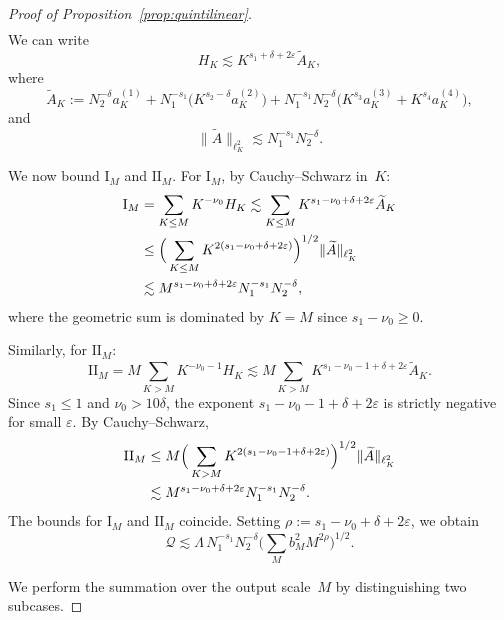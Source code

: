 \documentclass[11pt,reqno,english]{amsart}
\numberwithin{equation}{section}
\theoremstyle{plain}
\theoremstyle{definition}
\theoremstyle{remark}
\renewcommand{\epsilon}{\varepsilon}
\begin{document}
\begin{proof}[Proof of Proposition~\ref{prop:quintilinear}]
\begin{align}
\end{align}
We can write
\begin{equation}\label{eq:HK-final}
	H_K \lesssim K^{s_1+\delta+2\epsilon} \widetilde{A}_K,
\end{equation}
where
\[
\widetilde{A}_K := N_2^{-\delta} a_K^{(1)} + N_1^{-s_1} \big(K^{s_2-\delta} a_K^{(2)}\big) + N_1^{-s_1} N_2^{-\delta} \big(K^{s_3} a_K^{(3)} + K^{s_4} a_K^{(4)}\big),
\]
and
\begin{equation}\label{eq:Atilde-norm}
	\|\widetilde{A}\|_{\ell_K^2} \lesssim N_1^{-s_1} N_2^{-\delta}.
\end{equation}

We now bound $\mathrm{I}_M$ and $\mathrm{II}_M$. For $\mathrm{I}_M$, by Cauchy--Schwarz in~$K$:
\begin{align}
	\mathrm{I}_M &= \sum_{K \le M} K^{-\nu_0} H_K \lesssim \sum_{K \le M} K^{s_1 - \nu_0 + \delta + 2\epsilon} \widetilde{A}_K \notag \\
	&\le \Big(\sum_{K \le M} K^{2(s_1 - \nu_0 + \delta + 2\epsilon)}\Big)^{1/2} \|\widetilde{A}\|_{\ell_{K}^2} \notag \\
	&\lesssim M^{s_1 - \nu_0 + \delta + 2\epsilon} N_1^{-s_1} N_2^{-\delta}, \label{eq:IM-bound}
\end{align}
where the geometric sum is dominated by $K=M$ since $s_1 - \nu_0 \geq 0$.

Similarly, for $\mathrm{II}_M$:
\[
\mathrm{II}_M = M \sum_{K > M} K^{-\nu_0-1} H_K \lesssim M \sum_{K > M} K^{s_1 - \nu_0 - 1 + \delta + 2\epsilon} \widetilde{A}_K.
\]
Since $s_1 \le 1$ and $\nu_0 > 10\delta$, the exponent $s_1 - \nu_0 - 1 + \delta + 2\epsilon$ is strictly negative for small $\epsilon$. By Cauchy--Schwarz,
\begin{align}
	\mathrm{II}_M &\le M \Big(\sum_{K > M} K^{2(s_1 - \nu_0 - 1 + \delta + 2\epsilon)}\Big)^{1/2} \|\widetilde{A}\|_{\ell_{K}^2} \notag \\
	&\lesssim M^{s_1 - \nu_0 + \delta + 2\epsilon} N_1^{-s_1} N_2^{-\delta}. \label{eq:IIM-bound}
\end{align}
The bounds for $\mathrm{I}_M$ and $\mathrm{II}_M$ coincide. Setting $\rho := s_1 - \nu_0 + \delta + 2\epsilon$, we obtain
\begin{equation}\label{eq:Q-intermediate}
	\mathcal{Q} \lesssim \Lambda\, N_1^{-s_1} N_2^{-\delta} \Big(\sum_M b_M^2 M^{2\rho}\Big)^{1/2}.
\end{equation}

We perform the summation over the output scale~$M$ by distinguishing two subcases.


\end{proof}
\end{document}
